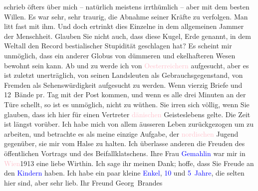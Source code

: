                    schrieb öfters über mich – natürlich meistens irrthümlich – aber mit dem besten
                    Willen.\pend
           \pstart
           Es war sehr, sehr traurig, die Abnahme seiner Kräfte zu verfolgen. Man litt fast
                    mit ihm.\pend
           \pstart
           Und doch ertrinkt dies Einzelne in dem allgemeinen Jammer der Menschheit. Glauben
                    Sie nicht  auch, dass diese Kugel, Erde
                    genannt, in dem Weltall den Record bestialischer Stupidität geschlagen hat? Es
                    scheint mir unmöglich, dass ein anderer Globus von dümmeren und ekelhafteren
                    Wesen bewohnt sein kann.\pend
           \pstart
           Ab und zu werde ich von \textcolor{pink}{Oesterreichern}{}\ledrightnote{\textcolor{pink}{Österreich}}
                    aufgesucht, aber es ist zuletzt unerträglich, von seinen Landsleuten als
                    Gebrauchsgegenstand, {\pb}von
                    Fremden als Sehenswürdigkeit aufgesucht zu werden. Wenn vierzig Briefe und
                    12 Bände pr. Tag  mit der Post \introOben{}kommen,\introOben{} und wenn es alle drei Minuten an der Türe
                    schellt, so ist es unmöglich, nicht zu wüthen.\pend
           \pstart
           Sie irren sich völlig, wenn Sie glauben, dass ich hier für einen Vertreter \textcolor{pink}{dänischen}{}\ledrightnote{\textcolor{pink}{Dänemark}} Geisteslebens gelte. Die Zeit ist
                    längst vorüber. Ich habe mich von allem äusseren Leben zurückgezogen um zu
                    arbeiten, und betrachte es als meine einzige Aufgabe, der \textcolor{pink}{nordischen}{}\ledrightnote{\textcolor{pink}{Skandinavien}} Jugend gegenüber, sie mir vom Halse zu halten.
                    Ich überlasse anderen die Freuden des öffentlichen Vortrags und des
                    Beifallklatschens.\pend
           \pstart
           Ihre Frau \textcolor{blue}{Gemahlin}{} war mir
                    in \textcolor{pink}{Wien}{}\ledrightnote{\textcolor{pink}{Wien}}{ }1913 eine liebe Wirthin. Ich sage ihr meinen Dank; hoffe, dass Sie
                    Freude an den \textcolor{blue}{Kindern}{} haben. Ich habe ein paar kleine \textcolor{blue}{Enkel}{}, \textcolor{blue}{10}{} und \textcolor{blue}{5 Jahre}{}, die selten hier sind, aber sehr lieb.\pend
           \pstart Ihr Freund \spacefill\mbox{Georg Brandes}\pend{}\endnumbering{}  
      